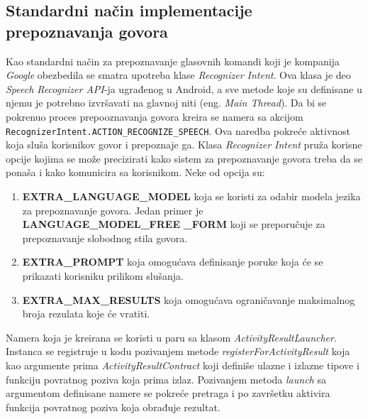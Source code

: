 \documentclass[struktura.tex]{subfiles}
\begin{document}
\subsection{Standardni način implementacije prepoznavanja govora}
Kao standardni način za prepoznavanje glasovnih komandi koji je kompanija \textit{Google} obezbedila se smatra upotreba klase \textit{Recognizer Intent}. Ova klasa je deo \textit{Speech Recognizer API}-ja ugrađenog u Android, a sve metode koje su definisane u njemu je potrebno izvršavati na glavnoj niti (eng. \textit{Main Thread}). Da bi se pokrenuo proces prepooznavanja govora kreira se namera sa akcijom \lstinline!RecognizerIntent.ACTION_RECOGNIZE_SPEECH!. Ova naredba pokreće aktivnost koja sluša korisnikov govor i prepoznaje ga. Klasa \textit{Recognizer Intent} pruža korisne opcije kojima se može precizirati kako sistem za prepoznavanje govora treba da se ponaša i kako komunicira sa korisnikom. Neke od opcija su:
\begin{enumerate}
    \item \textbf{EXTRA\_LANGUAGE\_MODEL} koja se koristi za odabir modela jezika za prepoznavanje govora. Jedan primer je \textbf{LANGUAGE\_MODEL\_FREE} \textbf{\_FORM} koji se preporučuje za prepoznavanje slobodnog stila govora.
    \item \textbf{EXTRA\_PROMPT} koja omogućava definisanje poruke koja će se prikazati korisniku prilikom slušanja.
    \item \textbf{EXTRA\_MAX\_RESULTS} koja omogućava ograničavanje maksimalnog broja rezulata koje će vratiti.
\end{enumerate}

Namera koja je kreirana se koristi u paru sa klasom \textit{ActivityResultLauncher}. Instanca se registruje u kodu pozivanjem metode \textit{registerForActivityResult} koja kao argumente prima \textit{ActivityResultContract} koji definiše ulazne i izlazne tipove i funkciju povratnog poziva koja prima izlaz. Pozivanjem metoda \textit{launch} sa argumentom definisane namere se pokreće pretraga i po završetku aktivira funkcija povratnog poziva koja obrađuje rezultat.
\end{document}
